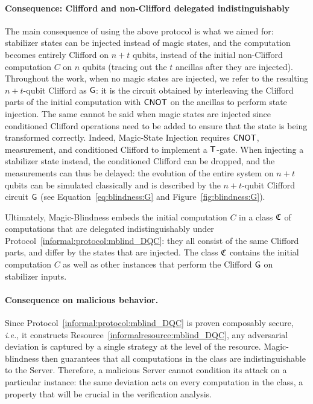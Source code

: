 \paragraph{Consequence: Clifford and non-Clifford delegated indistinguishably}
The main consequence of using the above protocol is what we aimed for: stabilizer states can be injected instead of magic states, and the computation becomes entirely Clifford on $n+t$ qubits, instead of the initial non-Clifford computation $C$ on $n$ qubits (tracing out the $t$ ancillas after they are injected). Throughout the work, when no magic states are injected, we refer to the resulting $n+t$-qubit Clifford as $\mathsf{G}$: it is the circuit obtained by interleaving the Clifford parts of the initial computation with $\mathsf{CNOT}$ on the ancillas to perform state injection. The same cannot be said when magic states are injected since conditioned Clifford operations need to be added to ensure that the state is being transformed correctly. Indeed, Magic-State Injection requires $\mathsf{CNOT}$, measurement, and conditioned Clifford to implement a $\mathsf{T}$-gate. When injecting a stabilizer state instead, the conditioned Clifford can be dropped, and the measurements can thus be delayed: the evolution of the entire system on $n+t$ qubits can be simulated classically and is described by the $n+t$-qubit Clifford circuit $\mathsf{G}$ (see Equation~\ref{eq:blindness:G} and Figure~\ref{fig:blindness:G}).

Ultimately, Magic-Blindness embeds the initial computation $C$ in a class $\mathfrak C$ of computations that are delegated indistinguishably under Protocol~\ref{informal:protocol:mblind_DQC}: they all consist of the same Clifford parts, and differ by the states that are injected. The class $\mathfrak C$ contains the initial computation $C$ as well as other instances that perform the Clifford $\mathsf{G}$ on stabilizer inputs.

\paragraph{Consequence on malicious behavior.}
Since Protocol~\ref{informal:protocol:mblind_DQC} is proven composably secure, \emph{i.e.}, it constructs Resource~\ref{informalresource:mblind_DQC}, any adversarial deviation is captured by a single strategy at the level of the resource. Magic-blindness then guarantees that all computations in the class are indistinguishable to the Server. Therefore, a malicious Server cannot condition its attack on a particular instance: the same deviation acts on every computation in the class, a property that will be crucial in the verification analysis.

